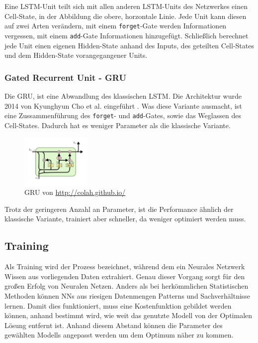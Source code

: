 \documentclass[pdftex,a4paper,halfparskip, article]{scrartcl}
\begin{document}
Eine LSTM-Unit teilt sich mit allen anderen LSTM-Units des Netzwerkes einen Cell-State, in der Abbildung die obere, horzontale Linie. Jede Unit kann diesen auf zwei Arten verändern, mit einem \texttt{forget}-Gate werden Informationen vergessen, mit einem \texttt{add}-Gate Informationen hinzugefügt. Schließlich berechnet jede Unit einen eigenen Hidden-State anhand des Inputs, des geteilten Cell-States und dem Hidden-State vorangegangener Units.


\subsubsection{Gated Recurrent Unit - GRU}

Die GRU, ist eine Abwandlung des klassischen LSTM. Die Architektur wurde 2014 von Kyunghyun Cho et al. eingeführt \cite{DBLP:journals/corr/ChoMGBSB14}. Was diese Variante ausmacht, ist eine Zussammenführung des \texttt{forget}- und \texttt{add}-Gates, sowie das Weglassen des Cell-States. Dadurch hat es weniger Parameter als die klassische Variante.
\begin{figure}[h]
\centering
\includegraphics[width=0.3\textwidth]{colah_gru_small}
\caption{GRU von \url{http://colah.github.io/}}
\end{figure}
Trotz der geringeren Anzahl an Parameter, ist die Performance ähnlich der klassische Variante\cite{lstmSearchSpace}, trainiert aber schneller, da weniger optimiert werden muss. 


\subsection{Training}

Als Training wird der Prozess bezeichnet, während dem ein Neurales Netzwerk Wissen aus vorliegenden Daten extrahiert. Genau dieser Vorgang sorgt für den großen Erfolg von Neuralen Netzen. Anders als bei herkömmlichen Statistischen Methoden können NNs aus riesigen Datenmengen Patterns und Sachverhältnisse lernen. Damit dies funktioniert, muss eine Kostenfunktion gebildet werden können, anhand bestimmt wird, wie weit das genutzte Modell von der Optimalen Lösung entfernt ist. Anhand diesem Abstand können die Parameter des gewählten Modells angepasst werden um dem Optimum näher zu kommen.
\end{document}
